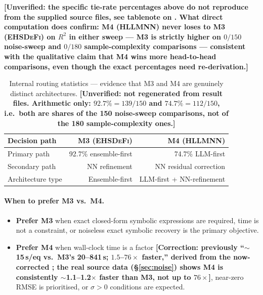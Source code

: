 \documentclass[twoside,11pt]{article}
\newcommand{\EHD}{\textsc{EHSDeFi}}
\newcommand{\HSL}{\textsc{HLLMNN}}
\newcommand{\Rsq}{R^{2}}
\begin{document}
\textbf{[Unverified: the specific tie-rate percentages above do not
reproduce from the supplied source files, see tablenote on
. What direct computation does confirm: M4 (\HSL)
never loses to M3 (\EHD) on $\Rsq$ in either sweep --- M3 is strictly
higher on $0/150$ noise-sweep and $0/180$ sample-complexity comparisons
--- consistent with the qualitative claim that M4 wins more head-to-head
comparisons, even though the exact percentages need re-derivation.]}

\begin{table}[H]
\centering
\caption{Internal routing statistics — evidence that M3 and M4 are genuinely
         distinct architectures. \textbf{[Unverified: not regenerated from result files. Arithmetic only: $92.7\%=139/150$ and $74.7\%=112/150$, i.e.\ both are shares of the 150 noise-sweep comparisons, not of the 180 sample-complexity ones.]}}
\label{tab:arch}
\small
\begin{tabular}{L{3.5cm} r r}
\toprule
\textbf{Decision path} & \textbf{M3 (\EHD)} & \textbf{M4 (\HSL)}\\
\midrule
Primary path    & 92.7\% ensemble-first  & 74.7\% LLM-first\\
Secondary path  & NN refinement          & NN residual correction\\
Architecture type & Ensemble-first       & LLM-first + NN-refinement\\
\bottomrule
\end{tabular}
\end{table}

\paragraph{When to prefer M3 vs.\ M4.}
\begin{itemize}
\item \textbf{Prefer M3} when exact closed-form symbolic expressions are
  required, time is not a constraint, or noiseless exact symbolic recovery
  is the primary objective.
\item \textbf{Prefer M4} when wall-clock time is a factor
  \textbf{[Correction: previously ``$\sim$15\,s/eq vs.\ M3's 20--841\,s;
  $1.5$--$76\times$ faster,'' derived from the now-corrected
  ; the real source data (\S\ref{sec:noise}) shows M4
  is consistently $\sim$1.1--1.2$\times$ faster than M3, not up to
  $76\times$]}, near-zero RMSE is prioritised, or $\sigma>0$ conditions are
  expected.
\end{itemize}
\end{document}
